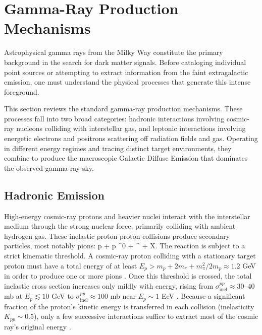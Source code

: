 
\section{Gamma-Ray Production Mechanisms}
\label{sec:production_mechanisms}

Astrophysical gamma rays from the Milky Way constitute the primary background in the search for dark matter signals.
Before cataloging individual point sources or attempting to extract information from the faint extragalactic emission, one must understand the physical processes that generate this intense foreground.

This section reviews the standard gamma-ray production mechanisms.
These processes fall into two broad categories: hadronic interactions involving cosmic-ray nucleons colliding with interstellar gas, and leptonic interactions involving energetic electrons and positrons scattering off radiation fields and gas.
Operating in different energy regimes and tracing distinct target environments, they combine to produce the macroscopic Galactic Diffuse Emission that dominates the observed gamma-ray sky.

\subsection{Hadronic Emission}
\label{sec:hadronic}

High-energy cosmic-ray protons and heavier nuclei interact with the interstellar medium through the strong nuclear force, primarily colliding with ambient hydrogen gas.
These inelastic proton-proton collisions produce secondary particles, most notably pions: 
\be
 p + p \to \pi^0 + \pi^{\pm} + X.
\ee
The reaction is subject to a strict kinematic threshold.
A cosmic-ray proton colliding with a stationary target proton must have a total energy of at least $E_p > m_p + 2m_\pi + m_\pi^2 / 2m_p \approx 1.2$ GeV in order to produce one or more pions \cite{Hooper:2024}.
Once this threshold is crossed, the total inelastic cross section increases only mildly with energy, rising from $\sigma_\text{inel}^{pp} \approx 30$--$40$ mb at $E_p \lesssim 10$ GeV to $\sigma_\text{inel}^{pp} \approx 100$ mb near $E_p \sim 1$ EeV \cite{Hooper:2024}.
Because a significant fraction of the proton's kinetic energy is transferred in each collision (inelasticity $K_{pp} \sim 0.5$), only a few successive interactions suffice to extract most of the cosmic ray's original energy \cite{Dermer:2009zz}.

